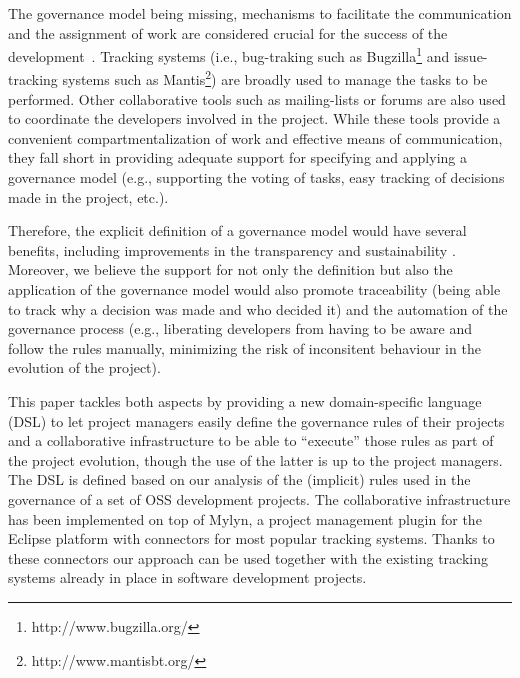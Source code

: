 The governance model being missing, mechanisms to facilitate the communication and the assignment of work are considered crucial for the success of the development~\cite{Mockus2000,Crowston2012}. Tracking systems (i.e., bug-traking such as Bugzilla\footnote{http://www.bugzilla.org/} and issue-tracking systems such as Mantis\footnote{http://www.mantisbt.org/}) are broadly used to manage the tasks to be performed. Other collaborative tools such as mailing-lists or forums are also used to coordinate the developers involved in the project. While these tools provide a convenient compartmentalization of work and effective means of communication, they fall short in providing adequate support for specifying and applying a governance model (e.g., supporting the voting of tasks, easy tracking of decisions made in the project, etc.). 

Therefore, the explicit definition of a governance model would have several benefits, including improvements in the transparency and sustainability \cite{osswatch}. Moreover, we believe the support for not only the definition but also the application of the governance model would also promote traceability (being able to track why a decision was made and who decided it) and the automation of the governance process (e.g., liberating developers from having to be aware and follow the rules manually, minimizing the risk of inconsitent behaviour in the evolution of the project). 


This paper tackles both aspects by providing a new domain-specific language (DSL) to let project managers easily define the governance rules of their projects and a collaborative infrastructure to be able to ``execute'' those rules as part of the project evolution, though the use of the latter is up to the project managers. The DSL is defined based on our analysis of the (implicit) rules used in the governance of a set of OSS development projects. The collaborative infrastructure has been implemented on top of Mylyn, a project management plugin for the Eclipse platform with connectors for most popular tracking systems. Thanks to these connectors our approach can be used together with the existing tracking systems already in place in software development projects. 

